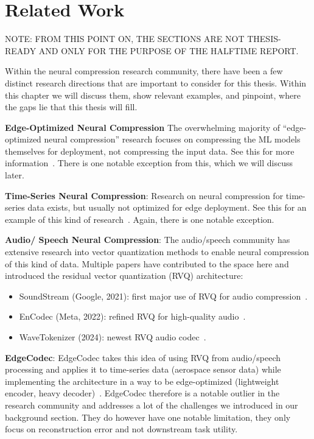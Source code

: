 \chapter{Related Work}

NOTE: FROM THIS POINT ON, THE SECTIONS ARE NOT THESIS-READY AND ONLY FOR THE PURPOSE OF THE HALFTIME REPORT. 

Within the neural compression research community, there have been a few distinct research directions that are important to consider for this thesis. Within this chapter we will discuss them, show relevant examples, and pinpoint, where the gaps lie that this thesis will fill. 

\textbf{Edge-Optimized Neural Compression} The overwhelming majority of ``edge-optimized neural compression'' research focuses on compressing the ML models themselves for deployment, not compressing the input data. See this for more information~\cite{Lai2026}. There is one notable exception from this, which we will discuss later. 

\textbf{Time-Series Neural Compression}: Research on neural compression for time-series data exists, but usually not optimized for edge deployment. See this for an example of this kind of research~\cite{ZHENG2023110797}. Again, there is one notable exception. 

\textbf{Audio/ Speech Neural Compression}: The audio/speech community has extensive research into vector quantization methods to enable neural compression of this kind of data. Multiple papers have contributed to the space here and introduced the residual vector quantization (RVQ) architecture:

\begin{itemize}
    \item SoundStream (Google, 2021): first major use of RVQ for audio compression~\cite[pp.~495--507]{zeghidour2021soundstream}.
    \item EnCodec (Meta, 2022): refined RVQ for high-quality audio~\cite{defossez2022high}.
    \item WaveTokenizer (2024): newest RVQ audio codec~\cite{ji2024wavtokenizer}.
\end{itemize}

\textbf{EdgeCodec}: EdgeCodec takes this idea of using RVQ from audio/speech processing and applies it to time-series data (aerospace sensor data) while implementing the architecture in a way to be edge-optimized (lightweight encoder, heavy decoder)~\cite{hodo2025edgecodec}. EdgeCodec therefore is a notable outlier in the research community and addresses a lot of the challenges we introduced in our background section. They do however have one notable limitation, they only focus on reconstruction error and not downstream task utility.  

